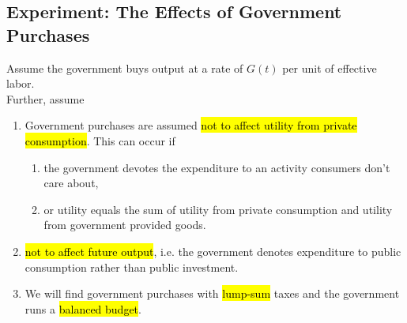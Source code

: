 \documentclass[]{article}
\begin{document}
		\subsection{Experiment: The Effects of Government Purchases}
			\begin{assumption}
				Assume the government buys output at a rate of $G(t)$ per unit of effective labor.\\
				Further, assume
				\begin{enumerate}
					\item Government purchases are assumed \hl{not to affect utility from private consumption}. This can occur if
					\begin{enumerate}
						\item the government devotes the expenditure to an activity consumers don't care about, 
						\item or utility equals the sum of utility from private consumption and utility from government provided goods.
					\end{enumerate}
					\item \hl{not to affect future output}, i.e. the government denotes expenditure to public consumption rather than public investment.
					\item We will find government purchases with \hl{lump-sum} taxes and the government runs a \hl{balanced budget}.
					\end{enumerate}
			\end{assumption}
\end{document}
